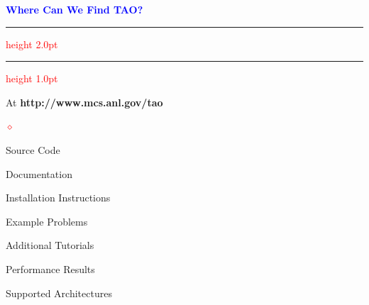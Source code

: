 \documentclass{seminar}
\newcommand{\reddiamond}{\textcolor{red}{$\diamond$}}
\newcommand{\redstripe}{\textcolor{red}{\hrule height 2.0pt\hfil}
             \vspace{-1.8pt}
             \textcolor{red}{\hrule height 1.0pt\hfil}
}
\newcommand{\heading}[1]{%
   \centerline{\textcolor{blue}{\textbf{#1}}}%
    \redstripe%
    \bigskip
}
\begin{document}
\begin{slide}
\heading{Where Can We Find TAO?}

At {\bf http://www.mcs.anl.gov/tao}

\begin{list}{\reddiamond}{\leftmargin=1in}
\item
Source Code
\item
Documentation
\item
Installation Instructions
\item
Example Problems
\item
Additional Tutorials
\item
Performance Results
\item
Supported Architectures
\end{list}

\vfill

\end{slide}
\end{document}
